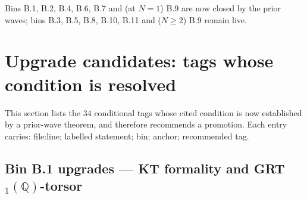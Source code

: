 \documentclass[11pt]{amsart}
\providecommand{\Q}{\mathbb{Q}}
\begin{document}
Bins B.1, B.2, B.4, B.6, B.7 and (at $N=1$) B.9 are now closed by the
prior waves; bins B.3, B.5, B.8, B.10, B.11 and ($N \geq 2$) B.9 remain
live.

\section{Upgrade candidates: tags whose condition is resolved}
\label{sec:upgrade-candidates}

This section lists the $34$ conditional tags whose cited condition is
now established by a prior-wave theorem, and therefore recommends a
promotion. Each entry carries: file:line; labelled statement; bin;
anchor; recommended tag.

\subsection{Bin B.1 upgrades --- KT formality and GRT$_1(\Q)$-torsor}
\label{subsec:upgrades-b1}
\end{document}
